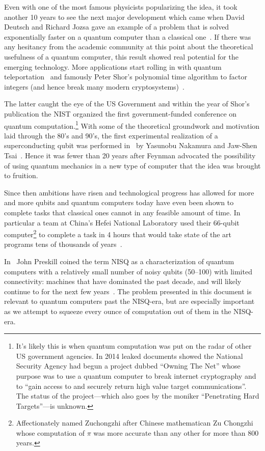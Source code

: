 Even with one of the most famous physicists popularizing the idea, it took another 10 years to see the next major development which came when David Deutsch and Richard Jozsa gave an example of a problem that is solved exponentially faster on a quantum computer than a classical one~\cite{deutch-jozsa-algo}.
If there was any hesitancy from the academic community at this point about the theoretical usefulness of a quantum computer, this result showed real potential for the emerging technology.
More applications start rolling in with quantum teleportation~\cite{quantumteleportation} and famously Peter Shor's polynomial time algorithm to factor integers (and hence break many modern cryptosystems)~\cite{shor-encryption}.

The latter caught the eye of the US Government and within the year of Shor's publication the \ac{NIST} organized the first government-funded conference on quantum computation.\footnote{It's likely this is when quantum computation was put on the radar of other US government agencies. In 2014 leaked documents showed the National Security Agency had begun a project dubbed ``Owning The Net'' whose purpose was to use a quantum computer to break internet cryptography and to ``gain access to and securely return high value target communications''. The status of the project---which also goes by the moniker ``Penetrating Hard Targets''---is unknown.}
With some of the theoretical groundwork and motivation laid through the 80's and 90's, the first experimental realization of a superconducting qubit was performed in~\citeyear{firstqubit} by Yasunobu Nakamura and Jaw-Shen Tsai~\cite{firstqubit}.
Hence it was fewer than 20 years after Feynman advocated the possibility of using quantum mechanics in a new type of computer that the idea was brought to fruition. %

Since then ambitions have risen and technological progress has allowed for more and more qubits and quantum computers today have even been shown to complete tasks that classical ones cannot in any feasible amount of time.
In particular a team at China's Hefei National Laboratory used their 66-qubit computer\footnote{Affectionately named Zuchongzhi after Chinese mathematican Zu Chongzhi whose computation of $\pi$ was more accurate than any other for more than 800 years.} to complete a task in 4 hours that would take state of the art programs tens of thousands of years~\cite{zuchongzhi}.

In~\citeyear{nisq} John Preskill coined the term \ac{NISQ} as a characterization of quantum computers with a relatively small number of noisy qubits (50--100) with limited connectivity: \ie{} machines that have dominated the past decade, and will likely continue to for the next few years~\cite{nisq}.
The problem presented in this document is relevant to quantum computers past the \ac{NISQ}-era, but are especially important as we attempt to squeeze every ounce of computation out of them in the \ac{NISQ}-era.

